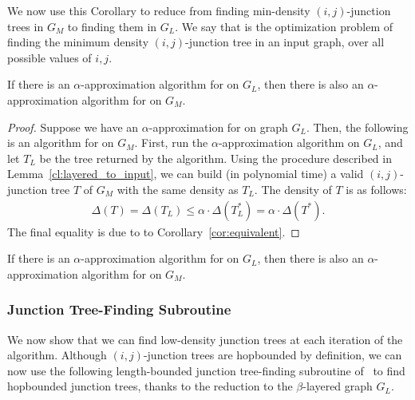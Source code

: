 We now use this Corollary to reduce from finding min-density $(i,j)$-junction trees in $G_M$ to finding them in $G_L$. We say that {\jt} is the optimization problem of finding the minimum density $(i,j)$-junction tree in an input graph, over all possible values of $i,j$.

\begin{lemma}
\label{lem:reduction}
     If there is an $\alpha$-approximation algorithm for {\jt} on $G_L$, then there is also an $\alpha$-approximation algorithm for {\jt} on $G_M$. 
\end{lemma}
\begin{proof}
    Suppose we have an $\alpha$-approximation for {\jt} on graph $G_L$. Then, the following is an algorithm for {\jt} on $G_M$. First, run the $\alpha$-approximation algorithm on $G_L$, and let $T_L$ be the tree returned by the algorithm. Using the procedure described in Lemma~\ref{cl:layered_to_input}, we can build (in polynomial time) a valid $(i,j)$-junction tree $T$ of $G_M$ with the same density as $T_L$. The density of $T$ is as follows:
    \begin{align*}
        \Delta(T) = \Delta(T_L) \leq \alpha \cdot \Delta(T_L^*) = \alpha \cdot \Delta(T^*).
    \end{align*}
    The final equality is due to to Corollary~\ref{cor:equivalent}.
\end{proof}

\else
\begin{lemma}
\label{lem:reduction}
     If there is an $\alpha$-approximation algorithm for {\jt} on $G_L$, then there is also an $\alpha$-approximation algorithm for {\jt} on $G_M$. 
\end{lemma}
\fi

\subsubsection{Junction Tree-Finding Subroutine}
We now show that we can find low-density junction trees at each iteration of the algorithm. Although $(i,j)$-junction trees are hopbounded by definition,  we can now use the following length-bounded junction tree-finding subroutine of~\cite{GKL23} to find hopbounded junction trees, thanks to the reduction to the $\beta$-layered graph $G_L$.

